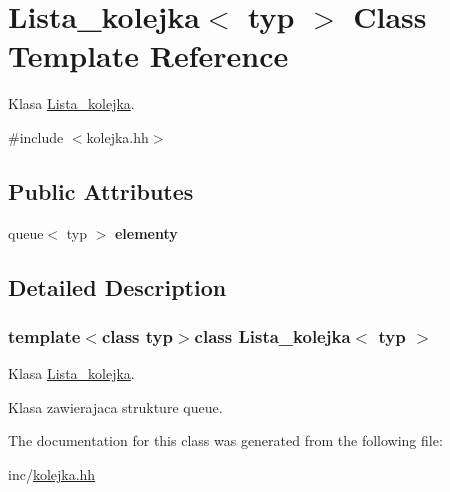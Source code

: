 \hypertarget{class_lista__kolejka}{\section{Lista\-\_\-kolejka$<$ typ $>$ Class Template Reference}
\label{class_lista__kolejka}
}


Klasa \hyperlink{class_lista__kolejka}{Lista\-\_\-kolejka}.  




{\ttfamily \#include $<$kolejka.\-hh$>$}

\subsection*{Public Attributes}
\begin{DoxyCompactItemize}
\item 
\hypertarget{class_lista__kolejka_a34f2f579efe4d98673df8a15fcd543cc}{queue$<$ typ $>$ {\bfseries elementy}}\label{class_lista__kolejka_a34f2f579efe4d98673df8a15fcd543cc}

\end{DoxyCompactItemize}


\subsection{Detailed Description}
\subsubsection*{template$<$class typ$>$class Lista\-\_\-kolejka$<$ typ $>$}

Klasa \hyperlink{class_lista__kolejka}{Lista\-\_\-kolejka}. 

Klasa zawierajaca strukture queue. 

The documentation for this class was generated from the following file\-:\begin{DoxyCompactItemize}
\item 
inc/\hyperlink{kolejka_8hh}{kolejka.\-hh}\end{DoxyCompactItemize}
